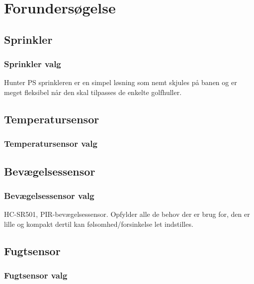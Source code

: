 \chapter{Forundersøgelse}

\section{Sprinkler}								%

\subsection{Sprinkler valg}						%
Hunter PS sprinkleren er en simpel løsning som nemt skjules på banen og er meget fleksibel når den skal tilpasses de enkelte golfhuller.

\section{Temperatursensor}						

\subsection{Temperatursensor valg}				%

\section{Bevægelsessensor}						

\subsection{Bevægelsessensor valg}				%
HC-SR501, PIR-bevægelsessensor. Opfylder alle de behov der er brug for, den er lille og kompakt dertil kan følsomhed/forsinkelse let indstilles.

\section{Fugtsensor}						

\subsection{Fugtsensor valg}						%
